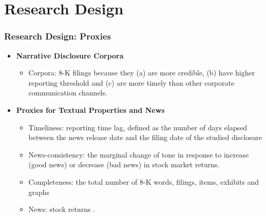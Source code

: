\documentclass{beamer}
\begin{document}
\section{Research Design}
\begin{frame}
\frametitle{Research Design: Proxies}
\begin{itemize}

\item \textbf{Narrative Disclosure Corpora}

	\begin{itemize}
		\item Corpora: 8-K filings because they (a) are more credible, (b) have higher reporting threshold and (c) are more timely than other corporate communication channels.
	\end{itemize}

\item \textbf{Proxies for Textual Properties and News}
	\begin{itemize}
		\item Timeliness: reporting time lag, defined as the number of days elapsed between the news release date and the filing date of the studied disclosure
		\item News-consistency: the marginal change of tone in response to increase (good news) or decrease (bad news) in stock market returns.
		\item Completeness: the total number of 8-K words, filings, items, exhibits and graphs
		\item News: stock returns \citep{basuConservatismPrincipleAsymmetric1997}.
	\end{itemize}

\end{itemize}
\end{frame}
\end{document}
